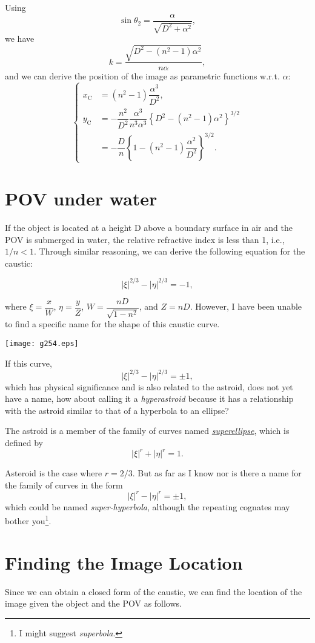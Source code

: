 \documentclass[twocolumn]{article}
\begin{document}
Using 
$$\sin\theta_2 = \dfrac{\alpha}{\sqrt{D^2+\alpha^2}},$$
we have
$$k = \dfrac{\sqrt{D^2-(n^2-1)\alpha^2}}{n\alpha},$$
and we can derive the position of the image as parametric functions w.r.t. $\alpha$:
$$ \left\{ 
\begin{aligned}
	x_{\mathrm{C}}^{} &= (n^2-1)\dfrac{\alpha^3}{D^2},\\
	y_{\mathrm{C}}^{} &= -\dfrac{n^2}{D^2}\dfrac{\alpha^3}{n^3\alpha^3}\left\{ D^2-(n^2-1)\alpha^2 \right\}^{3/2}\\
	&=-\dfrac{D}{n}\left\{ 1-(n^2-1)\dfrac{\alpha^2}{D^2} \right\}^{3/2}.
\end{aligned}
\right.$$

\section{POV under water}

If the object is located at a height D above a boundary surface in air and the POV
is submerged in water, the relative refractive index is less than 1, i.e., $1/n < 1$.
Through similar reasoning, we can derive the following equation for the caustic:

$$ \left| \xi \right|^{2/3} - \left| \eta \right|^{2/3} = -1, $$

where $\xi = \dfrac{x}{W} $, $\eta = \dfrac{y}{Z}$, $W = \dfrac{nD}{\sqrt{1-n^2}}$,
and $Z = nD$. However, I have been unable to find a specific name for the shape of 
this caustic curve.

\texttt{[image: g254.eps]}

If this curve, 
$$ \left| \xi \right|^{2/3} - \left| \eta \right|^{2/3} = \pm1, $$
which has physical significance and is also related to the astroid, does not yet have a name,
how about calling it a \emph{hyperastroid} because it has a relationship with the 
astroid similar to that of a hyperbola to an ellipse?

The astroid is a member of the 
family of curves named \href{https://mathworld.wolfram.com/Astroid.html}{\emph{superellipse}}, which is defined by 
$$ \left| \xi \right|^{r} + \left| \eta \right|^{r} = 1. $$

Asteroid is the case where $r=2/3$. But as far as I know nor is there a name for the 
family of curves in the form
$$ \left| \xi \right|^{r} - \left| \eta \right|^{r} = \pm 1, $$
which could be named \emph{super-hyperbola}, although the repeating cognates may 
bother you\footnote{I might suggest \emph{superbola}.}.

\section{Finding the Image Location}
Since we can obtain a closed form of the caustic, we can find the location of the 
image given the object and the POV as follows.
\end{document}
